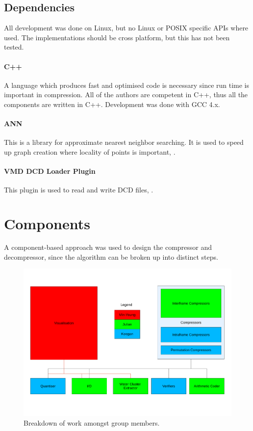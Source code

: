 \documentclass[a4paper]{report}
\begin{document}
\subsection{Dependencies}

All development was done on Linux, but no Linux or POSIX specific APIs where
used. The implementations should be cross platform, but this has not been
tested.

\paragraph{C++}
A language which produces fast and optimised code is necessary since run time
is important in compression. All of the authors are competent in C++, thus all
the components are written in C++. Development was done with GCC 4.x.

\paragraph{ANN}
This is a library for approximate nearest neighbor searching. It is used to
speed up graph creation where locality of points is important, \citep{ann}.

\paragraph{VMD DCD Loader Plugin}
This plugin is used to read and write DCD files, \citep{vmd}.


\section{Components}
\label{sec:components}

A component-based approach was used to design the compressor and decompressor,
since the algorithm can be broken up into distinct steps.

\begin{figure}
  \centering
  \includegraphics[trim = 0mm 25mm 0mm 25mm, clip, width=\textwidth]{images/breakdown}
  \caption{Breakdown of work amongst group members.}
\end{figure}
\end{document}

